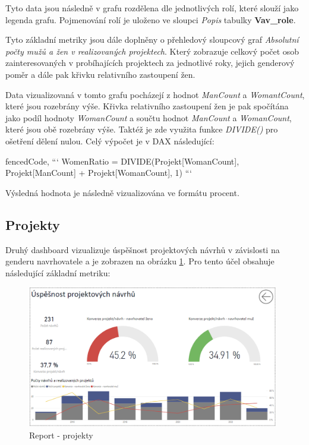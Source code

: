 \documentclass[
  digital,     %
  twoside,     %
  lof,         %
  lot,         %
]{fithesis4}
\begin{document}
Tyto data jsou následně v grafu rozdělena dle jednotlivých rolí, které slouží jako legenda grafu. Pojmenování rolí je uloženo ve sloupci \emph{Popis} tabulky \textbf{Vav\_role}. 


\vspace{5}
Tyto základní metriky jsou dále doplněny o přehledový sloupcový graf \emph{Absolutní počty mužů a žen v realizovaných projektech}. Který zobrazuje celkový počet osob zainteresovaných v probíhajících projektech za jednotlivé roky, jejich genderový poměr a dále pak křivku relativního zastoupení žen.  

Data vizualizovaná v tomto grafu pocházejí z hodnot \emph{ManCount} a \emph{WomantCount}, které jsou rozebrány výše. Křivka relativního zastoupení žen je pak spočítána jako podíl hodnoty \emph{WomanCount} a součtu hodnot \emph{ManCount} a \emph{WomanCount}, které jsou obě rozebrány výše. Taktéž je zde využita funkce \emph{DIVIDE()} pro ošetření dělení nulou. Celý výpočet je v DAX následující:

\begin{markdown*}{%
  fencedCode,
}
```
WomenRatio = DIVIDE(Projekt[WomanCount], 
                    Projekt[ManCount] + Projekt[WomanCount],
                    1)
```
\end{markdown*}
Výsledná hodnota je následně vizualizována ve formátu procent. 

\subsection{Projekty}
Druhý dashboard vizualizuje úspěšnost projektových návrhů v závislosti na genderu navrhovatele a je zobrazen na obrázku \ref{fig:projects}. Pro tento účel obsahuje následující základní metriku:

    \begin{figure}[t]
        \begin{center}
            \includegraphics[width=11cm]{img/projects.png}
        \end{center}
        \caption{Report - projekty}
        \label{fig:projects}
    \end{figure}
\end{document}

